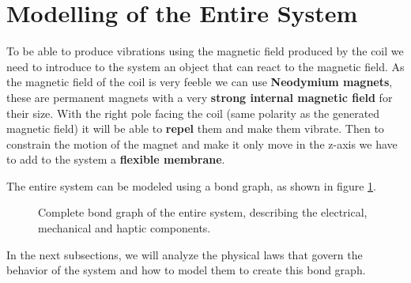 \section{Modelling of the Entire System}
To be able to produce vibrations using the magnetic field produced by the coil we need to introduce to the system an object that can react to the magnetic field. As the magnetic field of the coil is very feeble we can use \textbf{Neodymium magnets}, these are permanent magnets with a very \textbf{strong internal magnetic field} for their size.
With the right pole facing the coil (same polarity as the generated magnetic field) it will be able to \textbf{repel} them and make them vibrate.
Then to constrain the motion of the magnet and make it only move in the z-axis we have to add to the system a \textbf{flexible membrane}.

\begin{samepage}
    The entire system can be modeled using a bond graph, as shown in figure \ref{fig: Total_bond-graph}.
    \nopagebreak

    \begin{figure}[H]
        \centering
        \resizebox{1\linewidth}{!}{
            
        } %
        \caption{Complete bond graph of the entire system, describing the electrical, mechanical and haptic components.}
        \label{fig: Total_bond-graph}
    \end{figure}
\end{samepage}

In the next subsections, we will analyze the physical laws that govern the behavior of the system and how to model them to create this bond graph.







